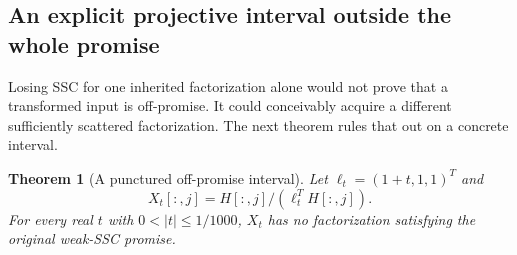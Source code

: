 \documentclass[11pt]{article}
\newtheorem{theorem}{Theorem}[section]
\theoremstyle{definition}\newtheorem{definition}[theorem]{Definition}
\begin{document}
\subsection{An explicit projective interval outside the whole promise}
Losing SSC for one inherited factorization alone would not prove that a transformed input is off-promise. It could conceivably acquire a different sufficiently scattered factorization. The next theorem rules that out on a concrete interval.

\begin{theorem}[A punctured off-promise interval]
\label{thm:offpromise}
Let $\ell_t=(1+t,1,1)^T$ and
\begin{equation}
 X_t[:,j]=H[:,j]/(\ell_t^TH[:,j]).
\end{equation}
For every real $t$ with $0<|t|\le1/1000$, $X_t$ has no factorization satisfying the original weak-SSC promise.
\end{theorem}
\end{document}
